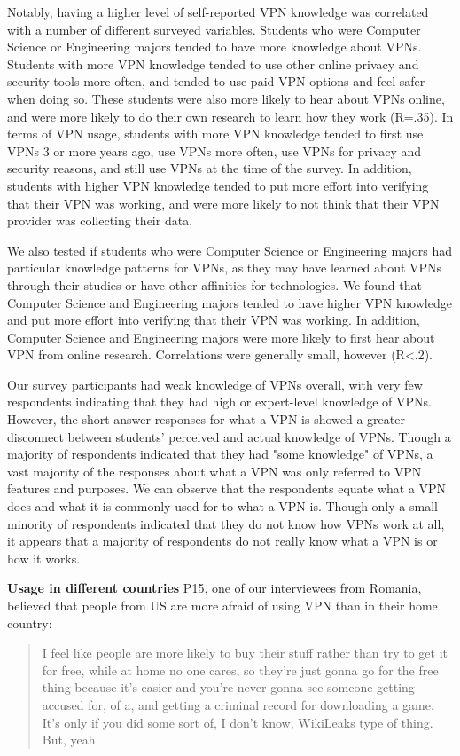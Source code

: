 Notably, having a higher level of self-reported VPN knowledge was correlated
with a number of different surveyed variables. Students who were Computer
Science or Engineering majors tended to have more knowledge about VPNs.
Students with more VPN knowledge tended to use other online privacy and
security tools more often, and tended to use paid VPN options and feel safer
when doing so. These students were also more likely to hear about VPNs online,
and were more likely to do their own research to learn how they work (R=.35).
In terms of VPN usage, students with more VPN knowledge tended to first use
VPNs 3 or more years ago, use VPNs more often, use VPNs for privacy and
security reasons, and still use VPNs at the time of the survey. In addition,
students with higher VPN knowledge tended to put more effort into verifying
that their VPN was working, and were more likely to not think that their VPN
provider was collecting their data.

We also tested if students who were Computer Science or Engineering majors had
particular knowledge patterns for VPNs, as they may have learned about VPNs
through their studies or have other affinities for technologies. We found that
Computer Science and Engineering majors tended to have higher VPN knowledge
and put more effort into verifying that their VPN was working. In addition,
Computer Science and Engineering majors were more likely to first hear about
VPN from online research. Correlations were generally small, however (R<.2).

Our survey participants had weak knowledge of VPNs overall, with very few
respondents indicating that they had high or expert-level knowledge of VPNs.
However, the short-answer responses for what a VPN is showed a greater
disconnect between students’ perceived and actual knowledge of VPNs. Though a
majority of respondents indicated that they had "some knowledge" of VPNs, a
vast majority of the responses about what a VPN was only referred to VPN
features and purposes. We can observe that the respondents equate what a VPN
does and what it is commonly used for to what a VPN is. Though only a small
minority of respondents indicated that they do not know how VPNs work at all,
it appears that a majority of respondents do not really know what a VPN is or
how it works.

\textbf{Usage in different countries}
P15, one of our interviewees from Romania, believed that people from US are
more afraid of using VPN than in their home country: \begin{quote}I feel like
people are more likely to buy their stuff rather than try to get it for free,
while at home no one cares, so they're just gonna go for the free thing
because it's easier and you're never gonna see someone getting accused for, of
a, and getting a criminal record for downloading a game. It's only if you did
some sort of, I don't know, WikiLeaks type of thing. But, yeah.\end{quote}


